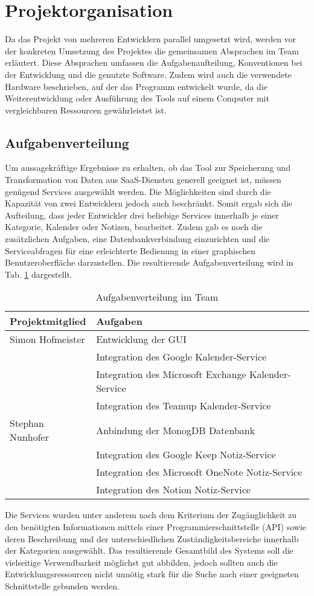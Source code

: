 \section{Projektorganisation}
Da das Projekt von mehreren Entwicklern parallel umgesetzt wird, werden vor der konkreten Umsetzung des Projektes die gemeinsamen Absprachen im Team erläutert. Diese Absprachen umfassen die Aufgabenaufteilung, Konventionen bei der Entwicklung und die genutzte Software. Zudem wird auch die verwendete Hardware beschrieben, auf der das Programm entwickelt wurde, da die Weiterentwicklung oder Ausführung des Tools auf einem Computer mit vergleichbaren Ressourcen gewährleistet ist.

\subsection{Aufgabenverteilung}
Um aussagekräftige Ergebnisse zu erhalten, ob das Tool zur Speicherung und Transformation von Daten aus SaaS-Diensten generell geeignet ist, müssen genügend Services ausgewählt werden. Die Möglichkeiten sind durch die Kapazität von zwei Entwicklern jedoch auch beschränkt. Somit ergab sich die Aufteilung, dass jeder Entwickler drei beliebige Services innerhalb je einer Kategorie, Kalender oder Notizen, bearbeitet. Zudem gab es noch die zusätzlichen Aufgaben, eine Datenbankverbindung einzurichten und die Serviceabfragen für eine erleichterte Bedienung in einer graphischen Benutzeroberfläche darzustellen. Die resultierende Aufgabenverteilung wird in Tab. \ref{tab:aufgabenverteilung} dargestellt.
\begin{table}[h]
	\caption{Aufgabenverteilung im Team}
	\label{tab:aufgabenverteilung}
		\begin{tabularx}{\textwidth}{ | l | X | }
		\hline
		Projektmitglied & Aufgaben \\ \hline
		Simon Hofmeister & Entwicklung der GUI \\ 
		& Integration des Google Kalender-Service\\ 
		& Integration des Microsoft Exchange Kalender-Service \\ 
		& Integration des Teamup Kalender-Service  \\ \hline
		Stephan Nunhofer & Anbindung der MonogDB Datenbank \\
		&  Integration des Google Keep Notiz-Service\\
		&  Integration des Microsoft OneNote Notiz-Service \\
		&  Integration des Notion Notiz-Service \\ \hline
	\end{tabularx}
\end{table}
Die Services wurden unter anderem nach dem Kriterium der Zugänglichkeit zu den benötigten Informationen mittels einer Programmierschnittstelle (API) sowie deren Beschreibung und der unterschiedlichen Zuständigkeitsbereiche innerhalb der Kategorien ausgewählt. Das resultierende Gesamtbild des Systems soll die vielseitige Verwendbarkeit möglichst gut abbilden, jedoch sollten auch die Entwicklungsressourcen nicht unnötig stark für die Suche nach einer geeigneten Schnittstelle gebunden werden. 

